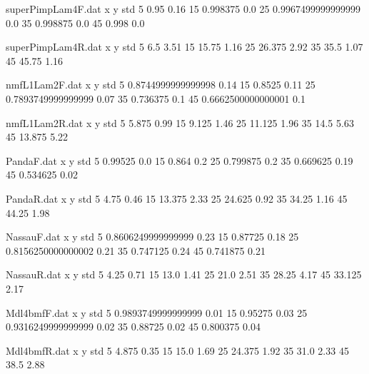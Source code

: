 \begin{filecontents}{superPimpLam4F.dat}
x y std
5 0.95 0.16
15 0.998375 0.0
25 0.9967499999999999 0.0
35 0.998875 0.0
45 0.998 0.0
\end{filecontents}
\begin{filecontents}{superPimpLam4R.dat}
x y std
5 6.5 3.51
15 15.75 1.16
25 26.375 2.92
35 35.5 1.07
45 45.75 1.16
\end{filecontents}
\begin{filecontents}{nmfL1Lam2F.dat}
x y std
5 0.8744999999999998 0.14
15 0.8525 0.11
25 0.7893749999999999 0.07
35 0.736375 0.1
45 0.6662500000000001 0.1
\end{filecontents}
\begin{filecontents}{nmfL1Lam2R.dat}
x y std
5 5.875 0.99
15 9.125 1.46
25 11.125 1.96
35 14.5 5.63
45 13.875 5.22
\end{filecontents}
\begin{filecontents}{PandaF.dat}
x y std
5 0.99525 0.0
15 0.864 0.2
25 0.799875 0.2
35 0.669625 0.19
45 0.534625 0.02
\end{filecontents}
\begin{filecontents}{PandaR.dat}
x y std
5 4.75 0.46
15 13.375 2.33
25 24.625 0.92
35 34.25 1.16
45 44.25 1.98
\end{filecontents}
\begin{filecontents}{NassauF.dat}
x y std
5 0.8606249999999999 0.23
15 0.87725 0.18
25 0.8156250000000002 0.21
35 0.747125 0.24
45 0.741875 0.21
\end{filecontents}
\begin{filecontents}{NassauR.dat}
x y std
5 4.25 0.71
15 13.0 1.41
25 21.0 2.51
35 28.25 4.17
45 33.125 2.17
\end{filecontents}
\begin{filecontents}{Mdl4bmfF.dat}
x y std
5 0.9893749999999999 0.01
15 0.95275 0.03
25 0.9316249999999999 0.02
35 0.88725 0.02
45 0.800375 0.04
\end{filecontents}
\begin{filecontents}{Mdl4bmfR.dat}
x y std
5 4.875 0.35
15 15.0 1.69
25 24.375 1.92
35 31.0 2.33
45 38.5 2.88
\end{filecontents}